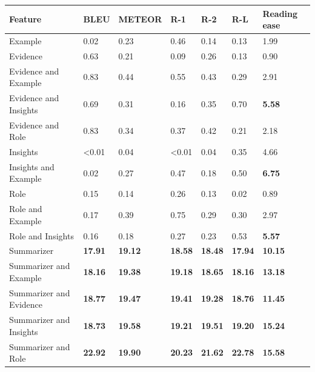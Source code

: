 \begin{tabular}{|l|l|l|l|l|l|l|}
\hline
\textbf{Feature} & BLEU & METEOR & R-1 & R-2 & R-L & Reading ease \\
 \hline
 Example & 0.02 & 0.23 & 0.46 & 0.14 & 0.13 & 1.99 \\
 \hline
 Evidence & 0.63 & 0.21 & 0.09 & 0.26 & 0.13 & 0.90 \\
 \hline
 Evidence and Example & 0.83 & 0.44 & 0.55 & 0.43 & 0.29 & 2.91 \\
 \hline
 Evidence and Insights & 0.69 & 0.31 & 0.16 & 0.35 & 0.70 & \textbf{5.58} \\
 \hline
 Evidence and Role & 0.83 & 0.34 & 0.37 & 0.42 & 0.21 & 2.18 \\
 \hline
 Insights & \textless{}0.01 & 0.04 & \textless{}0.01 & 0.04 & 0.35 & 4.66 \\
 \hline
 Insights and Example & 0.02 & 0.27 & 0.47 & 0.18 & 0.50 & \textbf{6.75} \\
 \hline
 Role & 0.15 & 0.14 & 0.26 & 0.13 & 0.02 & 0.89 \\
 \hline
 Role and Example & 0.17 & 0.39 & 0.75 & 0.29 & 0.30 & 2.97 \\
 \hline
 Role and Insights & 0.16 & 0.18 & 0.27 & 0.23 & 0.53 & \textbf{5.57} \\
 \hline
 Summarizer & \textbf{17.91} & \textbf{19.12} & \textbf{18.58} & \textbf{18.48} & \textbf{17.94} & \textbf{10.15} \\
 \hline
 Summarizer and Example & \textbf{18.16} & \textbf{19.38} & \textbf{19.18} & \textbf{18.65} & \textbf{18.16} & \textbf{13.18} \\
 \hline
 Summarizer and Evidence & \textbf{18.77} & \textbf{19.47} & \textbf{19.41} & \textbf{19.28} & \textbf{18.76} & \textbf{11.45} \\
 \hline
 Summarizer and Insights & \textbf{18.73} & \textbf{19.58} & \textbf{19.21} & \textbf{19.51} & \textbf{19.20} & \textbf{15.24} \\
 \hline
 Summarizer and Role & \textbf{22.92} & \textbf{19.90} & \textbf{20.23} & \textbf{21.62} & \textbf{22.78} & \textbf{15.58} \\
\hline
\end{tabular}
